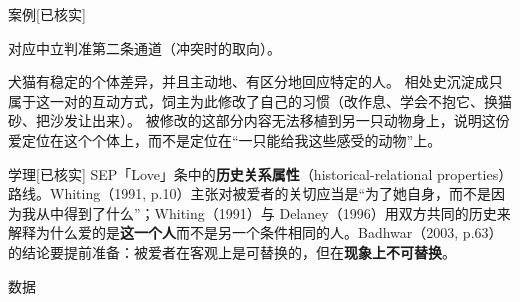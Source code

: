 \documentclass[prep,both]{debate}
\begin{document}
\begin{fields}
\begin{evidence}{案例}[已核实]
\end{evidence}
\closing[回扣判准]{对应中立判准第二条通道（冲突时的取向）。}
\begin{clash}
\end{clash}
\end{fields}
\begin{fields}
\begin{mechanism}[机制 （三步）]
\step 犬猫有稳定的个体差异，并且主动地、有区分地回应特定的人。
\step 相处史沉淀成只属于这一对的互动方式，饲主为此修改了自己的习惯（改作息、学会不抱它、换猫砂、把沙发让出来）。
\step 被修改的这部分内容无法移植到另一只动物身上，说明这份爱定位在这个个体上，而不是定位在“一只能给我这些感受的动物”上。

\end{mechanism}
\begin{evidence}{学理}[已核实]
SEP「Love」条中的\textbf{历史关系属性}（historical-relational properties）路线。Whiting（1991, p.10）主张对被爱者的关切应当是“为了她自身，而不是因为我从中得到了什么”；Whiting（1991）与 Delaney（1996）用双方共同的历史来解释为什么爱的是\textbf{这一个人}而不是另一个条件相同的人。Badhwar（2003, p.63）的结论要提前准备：被爱者在客观上是可替换的，但在\textbf{现象上不可替换}。
\end{evidence}
\begin{evidence}{数据}


\end{evidence}
\end{fields}
\end{document}
